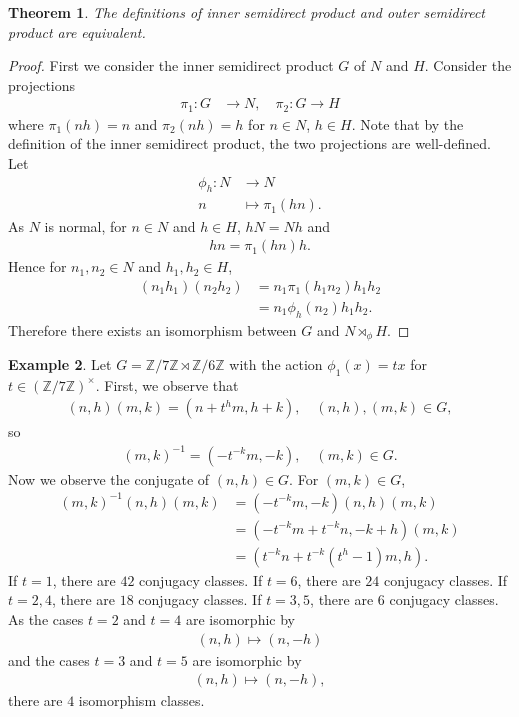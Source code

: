 \documentclass[12pt]{report}
\theoremstyle{plain}
\newtheorem{theorem}{Theorem}[section]
\theoremstyle{remark}
\theoremstyle{definition}
\newtheorem{example}[theorem]{Example}
\newcommand{\Z}{\mathbb{Z}}
\begin{document}
\begin{theorem}
    The definitions of inner semidirect product and outer semidirect product are equivalent.
\end{theorem}
\begin{proof}
    First we consider the inner semidirect product $G$ of $N$ and $H$. Consider the projections
    \begin{align*}
        \pi_1:G&\rightarrow N,\quad \pi_2:G\rightarrow H
    \end{align*}
    where $\pi_1(nh)=n$ and $\pi_2(nh)=h$ for $n\in N$, $h\in H$. Note that by the definition of the inner semidirect product, the two projections are well-defined. Let
    \begin{align*}
        \phi_h : N &\rightarrow N \\
        n &\mapsto \pi_1(hn).
    \end{align*}
    As $N$ is normal, for $n\in N$ and $h\in H$, $hN=Nh$ and
    \begin{align*}
        hn = \pi_1(hn)h.
    \end{align*}
    Hence for $n_1,n_2\in N$ and $h_1,h_2\in H$,
    \begin{align*}
        (n_1h_1)(n_2h_2) &= n_1 \pi_1(h_1n_2)h_1h_2 \\
        &= n_1\phi_h(n_2)h_1h_2.
    \end{align*}
    Therefore there exists an isomorphism between $G$ and $N\rtimes_\phi H$.
\end{proof}

\begin{example}
    Let $G=\Z/7\Z \rtimes \Z/6\Z$ with the action $\phi_1(x) = tx$ for $t\in(\Z/7\Z)^\times$. First, we observe that
    \begin{align*}
        (n,h)(m,k)=(n+t^hm,h+k),\quad (n,h),(m,k)\in G,
    \end{align*}
    so
    \begin{align*}
        (m,k)^{-1} = (-t^{-k}m,-k),\quad (m,k)\in G.
    \end{align*}
    Now we observe the conjugate of $(n,h)\in G$. For $(m,k)\in G$,
    \begin{align*}
        (m,k)^{-1}(n,h)(m,k) &= (-t^{-k}m,-k)(n,h)(m,k) \\
        &= (-t^{-k} m + t^{-k}n,-k+h)(m,k) \\
        &= (t^{-k}n+t^{-k}(t^h-1)m,h).
    \end{align*}
    If $t=1$, there are $42$ conjugacy classes. If $t=6$, there are $24$ conjugacy classes. If $t=2,4$, there are $18$ conjugacy classes. If $t=3,5$, there are $6$ conjugacy classes. As the cases $t=2$ and $t=4$ are isomorphic by
    \begin{align*}
        (n,h)\mapsto (n,-h)
    \end{align*}
    and the cases $t=3$ and $t=5$ are isomorphic by
    \begin{align*}
        (n,h)\mapsto (n,-h),
    \end{align*}
    there are $4$ isomorphism classes.
\end{example}
\end{document}
